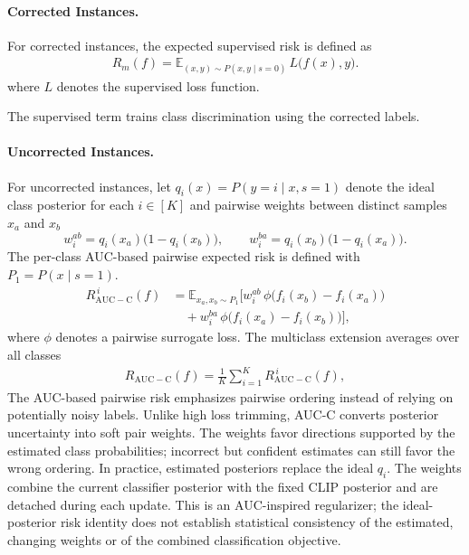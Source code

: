 \documentclass[10pt,twocolumn,letterpaper]{article}
\begin{document}
\paragraph{Corrected Instances.} For corrected instances, the expected supervised risk is defined as
\begin{equation}
\begin{aligned}
R_{m}(f)=\mathbb{E}_{(x,y)\sim P(x,y\mid s=0)}\,L\!\big(f(x),y\big).
\end{aligned}
\end{equation}
where $L$ denotes the supervised loss function.

The supervised term trains class discrimination using the corrected labels.

\paragraph{Uncorrected Instances.} For uncorrected instances, let $q_i(x)=P(y=i\mid x,s=1)$ denote the ideal class posterior for each $i\in[K]$ and pairwise weights between distinct samples $x_{a}$ and $x_{b}$
\[
w_{i}^{ab}=q_{i}(x_{a})\big(1-q_{i}(x_{b})\big),\qquad
w_{i}^{ba}=q_{i}(x_{b})\big(1-q_{i}(x_{a})\big).
\]
The per-class AUC-based pairwise expected risk is defined with \(P_{1}=P(x\mid s=1)\).
\begin{equation}
\begin{aligned}
R_{\mathrm{AUC-C}}^{\,i}(f)
&=\mathbb{E}_{x_{a},x_{b}\sim P_{1}}\!\Big[
w_{i}^{ab}\,\phi\!\big(f_{i}(x_{b})-f_{i}(x_{a})\big) \\
&\quad+w_{i}^{ba}\,\phi\!\big(f_{i}(x_{a})-f_{i}(x_{b})\big)\Big],
\end{aligned}
\end{equation}
where $\phi$ denotes a pairwise surrogate loss. The multiclass extension averages over all classes
\begin{equation}
\begin{aligned}
R_{\mathrm{AUC-C}}(f)=\frac{1}{K}\sum_{i=1}^{K}R_{\mathrm{AUC-C}}^{\,i}(f),
\end{aligned}
\end{equation}
The AUC-based pairwise risk emphasizes pairwise ordering instead of relying on potentially noisy labels. Unlike high loss trimming, AUC-C converts posterior uncertainty into soft pair weights. The weights favor directions supported by the estimated class probabilities; incorrect but confident estimates can still favor the wrong ordering. In practice, estimated posteriors replace the ideal $q_i$. The weights combine the current classifier posterior with the fixed CLIP posterior and are detached during each update. This is an AUC-inspired regularizer; the ideal-posterior risk identity does not establish statistical consistency of the estimated, changing weights or of the combined classification objective.
\end{document}
